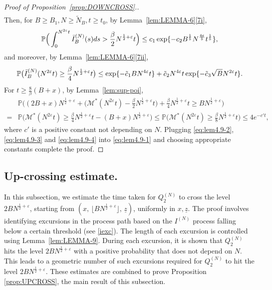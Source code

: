 \documentclass[11pt, reqno]{article}
\numberwithin{equation}{section}
\numberwithin{theorem}{section}
\begin{document}
\begin{proof}[Proof of Proposition~\ref{prop:DOWNCROSS}.]
\begin{align}
 \end{align}
Then, for $B\geq B_1,N\geq \tilde N_B,t\geq t_0$, by Lemma~\ref{lem:LEMMA-6}\ref{7i}, 
\begin{equation}\label{eq:lem4.9-2}
    \mathbb{P}\Big(\int_0^{N^{2\varepsilon}t}\Bar{I}_B^{(N)}(s)ds>\frac{\beta}{2}N^{\frac{1}{2}+\varepsilon}t\Big)\leq c_1\exp \{-c_2 B^{\frac{1}{5}}N^{\frac{4\varepsilon}{5}}t^{\frac{1}{5}}\},
\end{equation}
and moreover, by Lemma~\ref{lem:LEMMA-6}\ref{7ii}, \begin{equation}\label{eq:lem4.9-3}
    \mathbb{P}\big(\Bar{I}_B^{(N)}(N^{2\varepsilon}t)\geq \frac{\beta}{4}N^{\frac{1}{2}+\varepsilon}t\big)\leq \exp\{-\tilde{c}_1BN^{4\varepsilon}t\}+\tilde{c}_2N^{4\varepsilon}t \exp \{-\tilde{c}_3 \sqrt{B} N^{2\varepsilon}t\}.
\end{equation}
For $t\geq \frac{8}{\beta}(B+x)$, by Lemma~\ref{lem:sup-poi},
\begin{align}\label{eq:lem4.9-4}
    &\mathbb{P}\Big((2B+x)N^{\frac{1}{2}+\varepsilon}+\big(\mathcal{M}^{*}(N^{2\varepsilon }t)-\frac{\beta}{2}N^{\frac{1}{2}+\varepsilon}t\big)+\frac{\beta}{4}N^{\frac{1}{2}+\varepsilon}t\geq BN^{\frac{1}{2}+\varepsilon}\Big)\nonumber \\
    = & \mathbb{P}\big(\mathcal{M}^{*}(N^{2\varepsilon }t)\geq \frac{\beta}{4}N^{\frac{1}{2}+\varepsilon}t-(B+x)N^{\frac{1}{2}+\varepsilon}\big)
    \leq \mathbb{P}\big(\mathcal{M}^{*}(N^{2\varepsilon }t)\geq \frac{\beta}{8}N^{\frac{1}{2}+\varepsilon}t\big)\leq 4e^{-c't},
\end{align}
where $c'$ is a positive constant not depending on $N$.
Plugging \eqref{eq:lem4.9-2}, \eqref{eq:lem4.9-3} and \eqref{eq:lem4.9-4} into \eqref{eq:lem4.9-1} and choosing appropriate constants complete the proof.
\end{proof}


\subsection{Up-crossing estimate.}\label{upsec}
In this subsection, we estimate the time taken for $Q^{(N)}_2$ to cross the level $2B N^{\frac{1}{2} + \varepsilon}$, starting from $(x, \, \lfloor BN^{\frac{1}{2}+\varepsilon} \rfloor, \,\underline{z})$, uniformly in $x, \underline{z}$.
The proof involves identifying excursions in the process path based on the $I^{(N)}$ process falling below a certain threshold (see \eqref{iexc}). The length of each excursion is controlled using Lemma~\ref{lem:LEMMA-9}. During each excursion, it is shown that $Q_2^{(N)}$ hits the level $2BN^{\frac{1}{2} + \varepsilon}$ with a positive probability that does not depend on $N$. This leads to a geometric number of such excursions required for $Q_2^{(N)}$ to hit the level $2BN^{\frac{1}{2} + \varepsilon}$. These estimates are combined to prove Proposition \ref{prop:UPCROSS}, the main result of this subsection.
\end{document}
